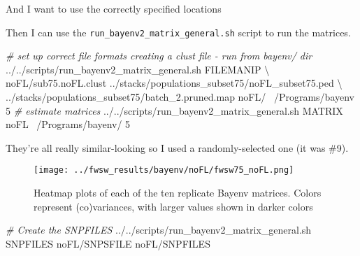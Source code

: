 \documentclass[11pt,]{article}
\newenvironment{Shaded}{\begin{snugshade}}{\end{snugshade}}
\newcommand{\KeywordTok}[1]{\textcolor[rgb]{0.13,0.29,0.53}{\textbf{#1}}}
\newcommand{\DataTypeTok}[1]{\textcolor[rgb]{0.13,0.29,0.53}{#1}}
\newcommand{\DecValTok}[1]{\textcolor[rgb]{0.00,0.00,0.81}{#1}}
\newcommand{\CharTok}[1]{\textcolor[rgb]{0.31,0.60,0.02}{#1}}
\newcommand{\StringTok}[1]{\textcolor[rgb]{0.31,0.60,0.02}{#1}}
\newcommand{\CommentTok}[1]{\textcolor[rgb]{0.56,0.35,0.01}{\textit{#1}}}
\newcommand{\OtherTok}[1]{\textcolor[rgb]{0.56,0.35,0.01}{#1}}
\newcommand{\OperatorTok}[1]{\textcolor[rgb]{0.81,0.36,0.00}{\textbf{#1}}}
\newcommand{\ExtensionTok}[1]{#1}
\newcommand{\NormalTok}[1]{#1}
\begin{document}
\begin{Shaded}
\end{Shaded}

And I want to use the correctly specified locations

Then I can use the \texttt{run\_bayenv2\_matrix\_general.sh} script to
run the matrices.

\begin{Shaded}
\begin{Highlighting}[]
\CommentTok{# set up correct file formats creating a clust file - run from bayenv/ dir}
\ExtensionTok{../../scripts/run_bayenv2_matrix_general.sh}\NormalTok{ FILEMANIP \textbackslash{}}
\NormalTok{noFL/sub75.noFL.clust ../stacks/populations_subset75/noFL_subset75.ped \textbackslash{}}
\NormalTok{../stacks/populations_subset75/batch_2.pruned.map noFL/ ~/Programs/bayenv 5}
\CommentTok{# estimate matrices}
\ExtensionTok{../../scripts/run_bayenv2_matrix_general.sh}\NormalTok{ MATRIX noFL ~/Programs/bayenv/ 5}
\end{Highlighting}
\end{Shaded}

They're all really similar-looking so I used a randomly-selected one (it
was \#9).

\begin{figure}
\centering
\texttt{[image: ../fwsw\_results/bayenv/noFL/fwsw75\_noFL.png]}
\caption{Heatmap plots of each of the ten replicate Bayenv matrices.
Colors represent (co)variances, with larger values shown in darker
colors}
\end{figure}

\begin{Shaded}
\begin{Highlighting}[]
\CommentTok{# Create the SNPFILES}
\ExtensionTok{../../scripts/run_bayenv2_matrix_general.sh}\NormalTok{ SNPFILES noFL/SNPSFILE noFL/SNPFILES}
\end{Highlighting}
\end{Shaded}
\end{document}
